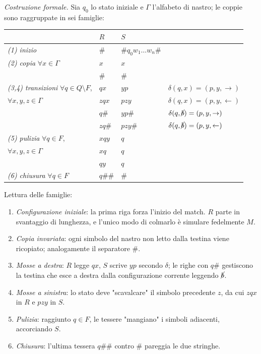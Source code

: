 {  \emph{Costruzione formale.} Sia $ q_0 $ lo stato iniziale e $ \Gamma $ l'alfabeto di nastro; le coppie sono raggruppate in sei famiglie:
  \begin{center}
    \begin{tabular}{ll|ll}
      &$ R $ & $ S $ & \\ \hline
      \emph{(1) inizio} &$ \# $ & $ \# q_0 w_1\ldots w_n\# $ & \\ \hline
      \emph{(2) copia} $ \forall x \in \Gamma $&$ x $ & $ x $ & \\
      &$ \# $ & $ \# $ &\\ \hline
      \emph{(3,4) transizioni} $ \forall q \in Q \setminus F $,&$ qx $ & $ yp $ & $ \delta(q,x) = (p, y, \to) $\\
      $ \forall x,y,z \in \Gamma $&$ zqx $ & $ pzy $ & $ \delta(q,x) = (p, y, \gets) $\\
      &$ q\# $ & $ yp\# $ & $ \delta(q,\cancel{b}) = (p, y, \to) $\\
      &$ zq\# $ & $ pzy\# $ & $ \delta(q,\cancel{b}) = (p, y, \gets) $\\ \hline
      \emph{(5) pulizia} $ \forall q \in F $,&$ xqy $&$ q  $&\\
      $ \forall x,y,z \in \Gamma $&$ xq $&$ q  $&\\
      &$ qy $&$ q  $&\\ \hline
      \emph{(6) chiusura} $ \forall q \in F $&$ q\#\# $&$ \#  $&
    \end{tabular}
  \end{center}
  Lettura delle famiglie:
  \begin{enumerate}
    \item \emph{Configurazione iniziale}: la prima riga forza l'inizio del match. $ R $ parte in svantaggio di lunghezza, e l'unico modo di colmarlo è simulare fedelmente $ M $.
    \item \emph{Copia invariata}: ogni simbolo del nastro non letto dalla testina viene ricopiato; analogamente il separatore $ \# $.
    \item \emph{Mosse a destra}: $ R $ legge $ qx $, $ S $ scrive $ yp $ secondo $ \delta $; le righe con $ q\# $ gestiscono la testina che esce a destra dalla configurazione corrente leggendo $ \cancel{b} $.
    \item \emph{Mosse a sinistra}: lo stato deve "scavalcare" il simbolo precedente $ z $, da cui $ zqx $ in $ R $ e $ pzy $ in $ S $.
    \item \emph{Pulizia}: raggiunto $ q \in F $, le tessere "mangiano" i simboli adiacenti, accorciando $ S $.
    \item \emph{Chiusura}: l'ultima tessera $ q\#\# $ contro $ \# $ pareggia le due stringhe.
  \end{enumerate}

}
